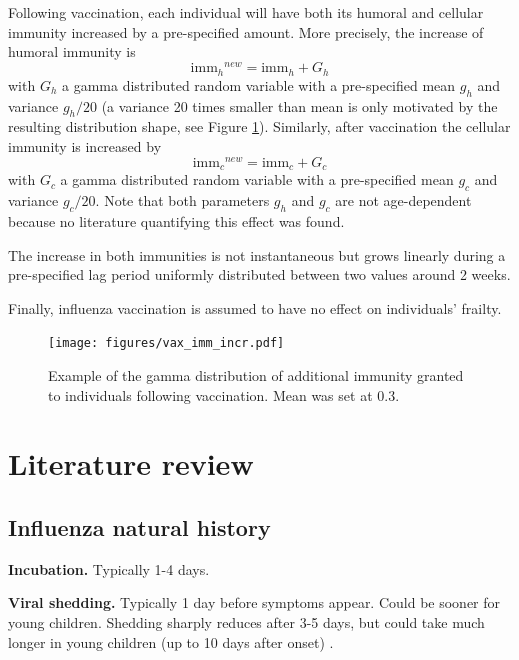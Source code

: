 \documentclass[11pt, onecolumn]{article}
\newcommand{\immh}{\ensuremath{\text{imm}_h}}
\newcommand{\immc}{\ensuremath{\text{imm}_c}}
\begin{document}
Following vaccination, each individual will have both its humoral and cellular immunity increased by a pre-specified amount. More precisely, the increase of humoral immunity is
\begin{equation}
\immh^{new} = \immh + G_h
\end{equation}
with $G_h$ a gamma distributed random variable with a pre-specified mean $g_h$ and variance $g_h/20$ (a variance 20 times smaller than mean is  only motivated by the resulting distribution shape, see Figure \ref{fig:vax_imm_incr}). 
Similarly, after vaccination the cellular immunity is increased by
\begin{equation}
\immc^{new} = \immc + G_c
\end{equation}
with $G_c$ a gamma distributed random variable with a pre-specified mean $g_c$ and variance $g_c/20$. 
Note that both parameters $g_h$ and $g_c$ are not age-dependent because no literature quantifying this effect was found.

The increase in both immunities is not instantaneous but grows linearly during a pre-specified lag period uniformly distributed between two values around 2 weeks.

Finally, influenza vaccination is assumed to have no effect on individuals' frailty. 

\begin{figure}[!ht]
\centering
    \texttt{[image: figures/vax\_imm\_incr.pdf]}
\caption{Example of the gamma distribution of additional immunity granted to individuals following vaccination. Mean was set at 0.3.}
\label{fig:vax_imm_incr}
\end{figure}








\newpage
\appendix

\section{Literature review}

\subsection{Influenza natural history}

\textbf{Incubation.} Typically 1-4 days.

\textbf{Viral shedding.} Typically 1 day before symptoms appear. Could be sooner for young children. Shedding sharply reduces after 3-5 days, but could take much longer in young children (up to 10 days after onset) \cite{Carrat:2008bk}. 
\end{document}
